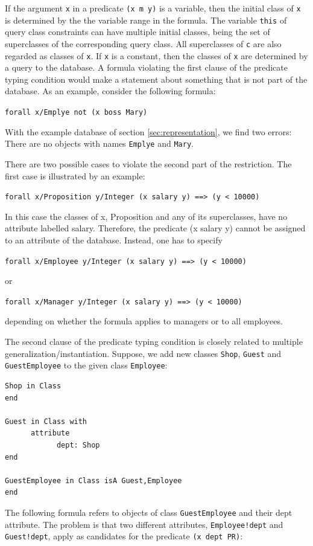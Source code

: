 If the argument {\tt x} in a predicate {\tt (x m y)} is a variable, 
then the initial class of {\tt x} is determined by the the variable range
in the formula. The variable {\tt this} of query class constraints
can have multiple initial classes, being the set of superclasses of the 
corresponding query class.
All superclasses of {\tt c} are also regarded as classes of {\tt x}. 
If {\tt x} is a constant, then the classes of {\tt x} are determined by a query to the database.
A formula violating the first clause of the predicate typing condition would make a
statement about something that is not part of the database. As an example,
consider the following formula:


{\tt forall x/Emplye not (x boss Mary)}


With the example database of section \ref{sec:representation}, we find two errors: There are no
objects with names {\tt Emplye} and {\tt Mary}.

There are two possible cases to violate the second part of the restriction.
The first case is illustrated by an example:

{\tt forall x/Proposition y/Integer (x salary y) ==> (y < 10000)}

In this case the classes of x, Proposition and any of its superclasses,
have no attribute labelled salary. Therefore, the predicate (x salary y)
cannot be assigned to an attribute of the database. Instead, one has to specify

{\tt forall x/Employee y/Integer (x salary y) ==> (y < 10000)}

  or

{\tt forall x/Manager y/Integer (x salary y) ==> (y < 10000)}

depending on whether the formula applies to managers or to all employees.

The second clause of the predicate typing condition is closely related to multiple
generalization/instan\-tia\-tion. Suppose, we add new classes {\tt Shop},
{\tt Guest} and {\tt GuestEmployee} to the given class {\tt Employee}:


\begin{verbatim}
Shop in Class
end

Guest in Class with
      attribute
            dept: Shop
end

GuestEmployee in Class isA Guest,Employee
end
\end{verbatim}

The following formula refers to objects of class {\tt GuestEmployee}
and their dept attribute. The problem is that two different
attributes, {\tt Employee!dept} and {\tt Guest!dept}, apply as
candidates for the predicate {\tt (x dept PR)}:


